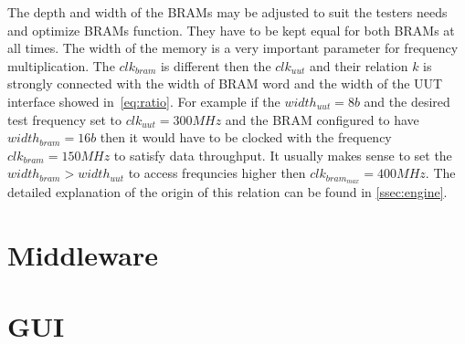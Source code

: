 The depth and width of the BRAMs may be adjusted to suit the testers needs and optimize BRAMs function. They have to be kept equal for both BRAMs at all times. The width of the memory is a very important parameter for frequency multiplication. The $clk_{bram}$ is different then the $clk_{uut}$ and their relation $k$ is strongly connected with the width of BRAM word and the width of the UUT interface showed in~\autoref{eq:ratio}. For example if the $width_{uut} = 8b$ and the desired test frequency set to $clk_{uut} = 300MHz$ and the BRAM configured to have $width_{bram} = 16b$ then it would have to be clocked with the frequency $clk_{bram} = 150MHz$ to satisfy data throughput. It usually makes sense to set the $width_{bram} > width_{uut}$ to access frequncies higher then $clk_{bram_{max}} = 400 MHz$. The detailed explanation of the origin of this relation can be found in \autoref{ssec:engine}.


\section{Middleware}
\section{GUI}